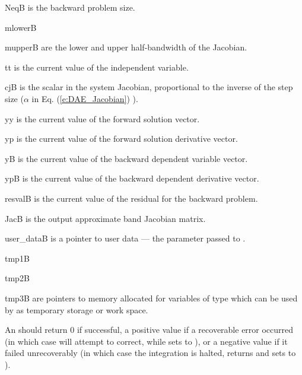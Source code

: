 {
  \begin{args}
  \item[NeqB]
    is the backward problem size.
  \item[mlowerB]
  \item[mupperB]
    are the lower and upper half-bandwidth of the Jacobian.
  \item[tt]
    is the current value of the independent variable.
  \item[cjB]
    is the scalar in the system Jacobian, proportional to the inverse of the
    step size ($\alpha$ in Eq. (\ref{e:DAE_Jacobian}) ).
  \item[yy]
    is the current value of the forward solution vector.
  \item[yp]
    is the current value of the forward solution derivative vector.
  \item[yB]
    is the current value of the backward dependent variable vector.
  \item[ypB]
    is the current value of the backward dependent derivative vector.
  \item[resvalB]
    is the current value of the residual for the backward problem.
  \item[JacB]
    is the output approximate band Jacobian matrix. 
  \item[user\_dataB]
    is a pointer to user data --- the parameter passed to . 
  \item[tmp1B]
  \item[tmp2B]
  \item[tmp3B]
    are pointers to memory allocated  for variables of type  which 
    can be used by  as temporary storage or work space.    
  \end{args}
}
{
  An  should return 0 if successful, a positive value if a recoverable
  error occurred (in which case {\idas} will attempt to correct, while {\idaband} sets
   to ), or a negative 
  value if it failed unrecoverably (in which case the integration is halted, 
  returns  and {\idadense} sets  to
  ).
}

